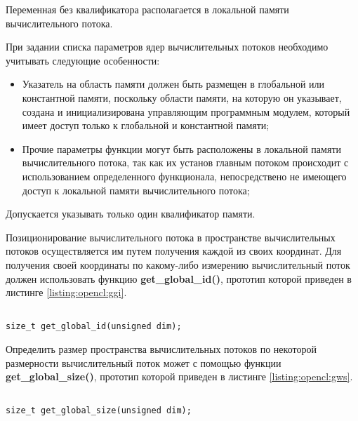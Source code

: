 		Переменная без квалификатора располагается в локальной памяти вычислительного потока.

		При задании списка параметров ядер вычислительных потоков необходимо учитывать следующие особенности:

		\begin{itemize}

			\item Указатель на область памяти должен быть размещен в глобальной или константной памяти, поскольку области памяти, на которую он указывает, создана и инициализирована управляющим программным модулем, который имеет доступ только к глобальной и константной памяти;

			\item Прочие параметры функции могут быть расположены в локальной памяти вычислительного потока, так как их установ главным потоком происходит с использованием определенного функционала, непосредствено не имеющего доступ к локальной памяти вычислительного потока;

		\end{itemize}

		Допускается указывать только один квалификатор памяти.


		Позиционирование вычислительного потока в пространстве вычислительных потоков осуществляется им путем получения каждой из своих координат. Для получения своей координаты по какому-либо измерению вычислительный поток должен использовать функцию {\bf get\_global\_id()}, прототип которой приведен в листинге \ref{listing:opencl:ggi}.

\begin{lstlisting}

size_t get_global_id(unsigned dim);

\end{lstlisting}
\mylistingend

		Определить размер пространства вычислительных потоков по некоторой размерности вычислительный поток может с помощью функции {\bf get\_global\_size()}, прототип которой приведен в листинге \ref{listing:opencl:gws}.

\begin{lstlisting}

size_t get_global_size(unsigned dim);

\end{lstlisting}
\mylistingend

